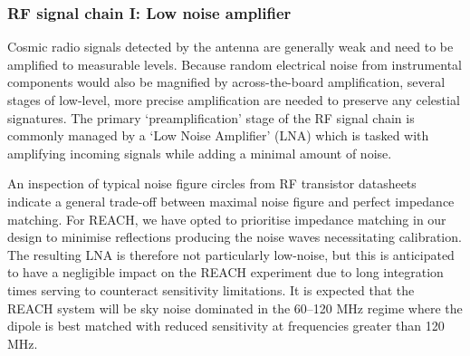 \subsubsection{RF signal chain I: Low noise amplifier}
Cosmic radio signals detected by the antenna are generally weak and need to be amplified to measurable levels. Because random electrical noise from instrumental components would also be magnified by across-the-board amplification, several stages of low-level, more precise amplification are needed to preserve any celestial signatures. The primary ‘preamplification’ stage of the RF signal chain is commonly managed by a ‘Low Noise Amplifier’ (LNA) which is tasked with amplifying incoming signals while adding a minimal amount of noise. 

An inspection of typical noise figure circles from RF transistor datasheets indicate a general trade-off between maximal noise figure and perfect impedance matching. For REACH, we have opted to prioritise impedance matching in our design to minimise reflections producing the noise waves necessitating calibration. The resulting LNA is therefore not particularly low-noise, but this is anticipated to have a negligible impact on the REACH experiment due to long integration times serving to counteract sensitivity limitations. It is expected that the REACH system will be sky noise dominated in the 60--120 MHz regime where the dipole is best matched with reduced sensitivity at frequencies greater than 120 MHz.

